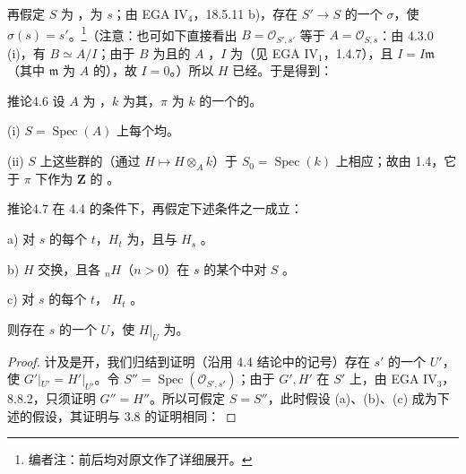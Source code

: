 再假定 $S$ 为 ，为 $s$；由 EGA IV$_4$，18.5.11 b)，存在 $S'\to S$ 的一个 $\sigma$，使 $\sigma(s)=s'$。\footnote[28]{编者注：前后均对原文作了详细展开。}（注意：也可如下直接看出 $B=\mathscr O_{S',s'}$ 等于 $A=\mathscr O_{S,s}$：由 4.3.0 (i)，有 $B\simeq A/I$；由于 $B$ 为且的 $A$ ，$I$ 为（见 EGA IV$_1$，1.4.7），且 $I=I\mathfrak m$（其中 $\mathfrak m$ 为 $A$ 的），故 $I=0$。）所以 $H$ 已经。于是得到：
\begin{SGAresult}{推论}{4.6}
设 $A$ 为 ，$k$ 为其，$\pi$ 为 $k$ 的一个的。

(i) $S=\operatorname{Spec}(A)$ 上每个均。

(ii) $S$ 上这些群的（通过 $H\mapsto H\otimes_A k$）于 $S_0=\operatorname{Spec}(k)$ 上相应；故由 1.4，它于 $\pi$ 下作为 $\mathbf Z$ 的 。
\end{SGAresult}
\begin{SGAresult}{推论}{4.7}
在 4.4 的条件下，再假定下述条件之一成立：

 a) 对 $s$ 的每个 $t$，$H_t$ 为，且与 $H_s$ 。

 b) $H$ 交换，且各 ${}_nH$（$n>0$）在 $s$ 的某个中对 $S$ 。

 c) 对 $s$ 的每个 $t$， $H_t$ 。

则存在 $s$ 的一个 $U$，使 $H|_U$ 为。
\end{SGAresult}
\begin{proof}
计及是开，我们归结到证明（沿用 4.4 结论中的记号）存在 $s'$ 的一个 $U'$，使 $G'|_{U'}=H'|_{U'}$。令 $S''=\operatorname{Spec}(\mathscr O_{S',s'})$；由于 $G',H'$ 在 $S'$ 上，由 EGA IV$_3$，8.8.2，只须证明 $G''=H''$。所以可假定 $S=S''$，此时假设 (a)、(b)、(c) 成为下述的假设，其证明与 3.8 的证明相同：
\end{proof}
